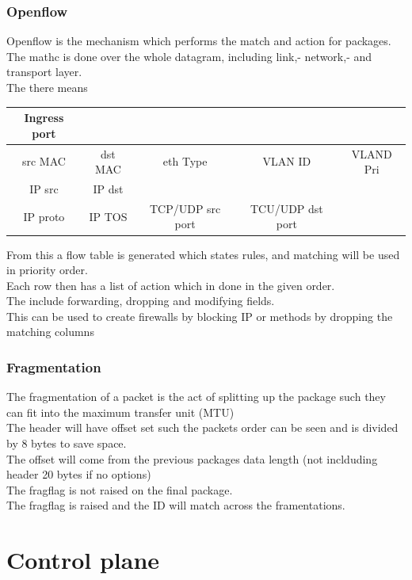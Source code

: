 \documentclass[12pt, a4paper]{article}
\begin{document}
			\subsubsection{Openflow}
				Openflow is the mechanism which performs the match and action for packages.\\
				The mathc is done over the whole datagram, including link,- network,- and transport layer.\\
				The there means\\
				\begin{tabular}{|c|c|c|c|c||}
				\hline
				Ingress port &&&&\\
				\hline
				src MAC & dst MAC & eth Type & VLAN ID & VLAND Pri \\
				\hline
				IP src & IP dst &&&\\
				\hline
				IP proto & IP TOS & TCP/UDP src port & TCU/UDP dst port&\\
				\hline
				\end{tabular}
				From this a flow table is generated which states rules, and matching will be used in priority order.\\
				Each row then has a list of action which in done in the given order.\\
				The include forwarding, dropping and modifying fields.\\
				This can be used to create firewalls by blocking IP or methods by dropping the matching columns
			\subsubsection{Fragmentation}
				The fragmentation of a packet is the act of splitting up the package such they can fit into the maximum transfer unit (MTU)\\
				The header will have offset set such the packets order can be seen and is divided by 8 bytes to save space.\\
				The offset will come from the previous packages data length (not inclduding header 20 bytes if no options)\\
				The fragflag is not raised on the final package. \\
				The fragflag is raised and the ID will match across the framentations.\\
	\section{Control plane}
\end{document}
